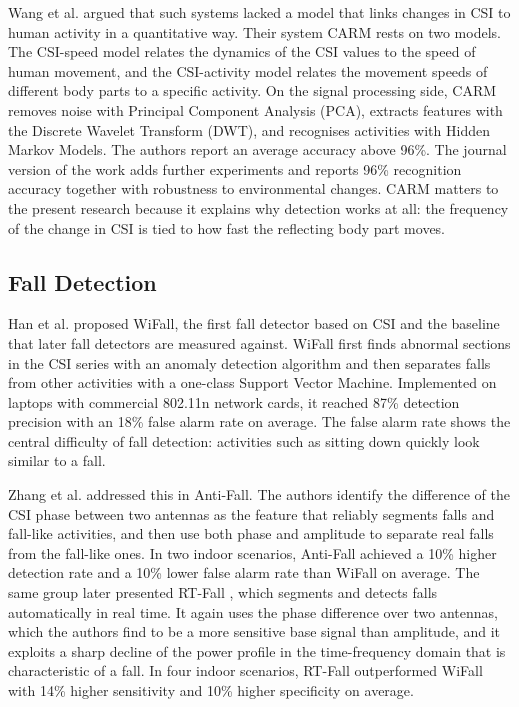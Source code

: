 Wang et al. \cite{carm} argued that such systems lacked a model that links changes in CSI to human activity in a quantitative way. Their system CARM rests on two models. The CSI-speed model relates the dynamics of the CSI values to the speed of human movement, and the CSI-activity model relates the movement speeds of different body parts to a specific activity. On the signal processing side, CARM removes noise with Principal Component Analysis (PCA), extracts features with the Discrete Wavelet Transform (DWT), and recognises activities with Hidden Markov Models. The authors report an average accuracy above 96\%. The journal version of the work \cite{carmjsac} adds further experiments and reports 96\% recognition accuracy together with robustness to environmental changes. CARM matters to the present research because it explains why detection works at all: the frequency of the change in CSI is tied to how fast the reflecting body part moves.

\subsection{Fall Detection}
Han et al. \cite{wifall} proposed WiFall, the first fall detector based on CSI and the baseline that later fall detectors are measured against. WiFall first finds abnormal sections in the CSI series with an anomaly detection algorithm and then separates falls from other activities with a one-class Support Vector Machine. Implemented on laptops with commercial 802.11n network cards, it reached 87\% detection precision with an 18\% false alarm rate on average. The false alarm rate shows the central difficulty of fall detection: activities such as sitting down quickly look similar to a fall.

Zhang et al. \cite{antifall} addressed this in Anti-Fall. The authors identify the difference of the CSI phase between two antennas as the feature that reliably segments falls and fall-like activities, and then use both phase and amplitude to separate real falls from the fall-like ones. In two indoor scenarios, Anti-Fall achieved a 10\% higher detection rate and a 10\% lower false alarm rate than WiFall on average. The same group later presented RT-Fall \cite{rtfall}, which segments and detects falls automatically in real time. It again uses the phase difference over two antennas, which the authors find to be a more sensitive base signal than amplitude, and it exploits a sharp decline of the power profile in the time-frequency domain that is characteristic of a fall. In four indoor scenarios, RT-Fall outperformed WiFall with 14\% higher sensitivity and 10\% higher specificity on average.

